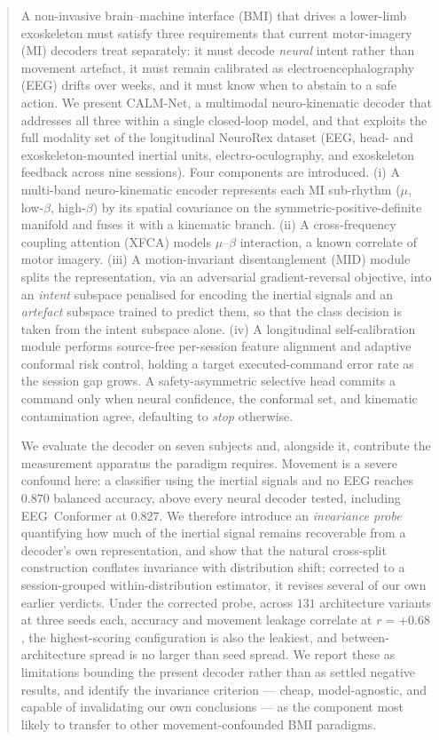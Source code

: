 \documentclass[journal]{IEEEtran}
\begin{document}
\begin{abstract}
A non-invasive brain--machine interface (BMI) that drives a lower-limb exoskeleton must
satisfy three requirements that current motor-imagery (MI) decoders treat separately: it
must decode \emph{neural} intent rather than movement artefact, it must remain calibrated
as electroencephalography (EEG) drifts over weeks, and it must know when to abstain to a
safe action. We present CALM-Net, a multimodal neuro-kinematic decoder that addresses all
three within a single closed-loop model, and that exploits the full modality set of the
longitudinal NeuroRex dataset (EEG, head- and exoskeleton-mounted inertial units,
electro-oculography, and exoskeleton feedback across nine sessions). Four components are
introduced. (i) A multi-band neuro-kinematic encoder represents each MI sub-rhythm
($\mu$, low-$\beta$, high-$\beta$) by its spatial covariance on the
symmetric-positive-definite manifold and fuses it with a kinematic branch. (ii) A
cross-frequency coupling attention (XFCA) models $\mu$--$\beta$ interaction, a known
correlate of motor imagery. (iii) A motion-invariant disentanglement (MID) module splits
the representation, via an adversarial gradient-reversal objective, into an \emph{intent}
subspace penalised for encoding the inertial signals and an \emph{artefact} subspace
trained to predict them, so that the class decision is taken from the intent subspace
alone. (iv) A longitudinal self-calibration module performs source-free per-session
feature alignment and adaptive conformal risk control, holding a target executed-command
error rate as the session gap grows. A safety-asymmetric selective head commits a command
only when neural confidence, the conformal set, and kinematic contamination agree,
defaulting to \emph{stop} otherwise.

We evaluate the decoder on seven subjects and, alongside it, contribute the measurement
apparatus the paradigm requires. Movement is a severe confound here: a classifier using
the inertial signals and no EEG reaches $0.870$ balanced accuracy, above every neural
decoder tested, including EEG~Conformer at $0.827$. We therefore introduce an
\emph{invariance probe} quantifying how much of the inertial signal remains recoverable
from a decoder's own representation, and show that the natural cross-split construction
conflates invariance with distribution shift; corrected to a session-grouped
within-distribution estimator, it revises several of our own earlier verdicts. Under the
corrected probe, across $131$ architecture variants at three seeds each, accuracy and
movement leakage correlate at $r = +0.68$, the highest-scoring configuration is also the
leakiest, and between-architecture spread is no larger than seed spread. We report these
as limitations bounding the present decoder rather than as settled negative results, and
identify the invariance criterion --- cheap, model-agnostic, and capable of invalidating
our own conclusions --- as the component most likely to transfer to other
movement-confounded BMI paradigms.
\end{abstract}
\end{document}
